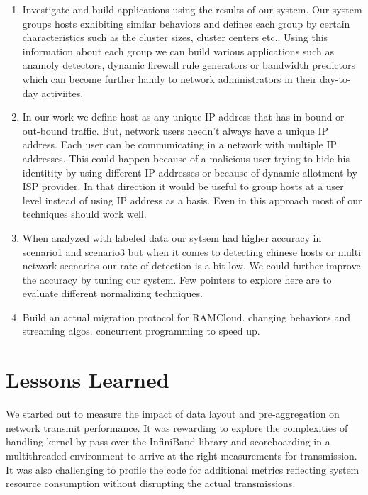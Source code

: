 \begin{enumerate}
	\item Investigate and build applications using the results of our system. Our system groups hosts exhibiting similar behaviors and defines each group by certain characteristics such as the cluster sizes, cluster centers etc.. Using this information about each group we can build various applications such as anamoly detectors, dynamic firewall rule generators or bandwidth predictors which can become further handy to network administrators in their day-to-day activiites.
	
	\item In our work we define host as any unique IP address that has in-bound or out-bound traffic. But, network users needn't always have a unique IP address. Each user can be communicating in a network with multiple IP addresses. This could happen because of a malicious user trying to hide his identitity by using different IP addresses or because of dynamic allotment by ISP provider. In that direction it would be useful to group hosts at a user level instead of using IP address as a basis. Even in this approach most of our techniques should work well. 
	
	\item When analyzed with labeled data our sytsem had higher accuracy in scenario1 and scenario3 but when it comes to detecting chinese hosts or multi network scenarios our rate of detection is a bit low. We could further improve the accuracy by tuning our system. Few pointers to explore here are to evaluate different normalizing techniques.
	
	\item Build an actual migration protocol for RAMCloud. changing behaviors and streaming algos.	 concurrent programming to speed up.
\end{enumerate}

\section{Lessons Learned}
We started out to measure the impact of data layout and pre-aggregation on network transmit performance. 
It was rewarding to explore the complexities of handling kernel by-pass over the InfiniBand library and 
scoreboarding in a multithreaded environment to arrive at the right measurements for transmission.
It was also challenging to profile the code for additional metrics reflecting system resource consumption 
without disrupting the actual transmissions. 

